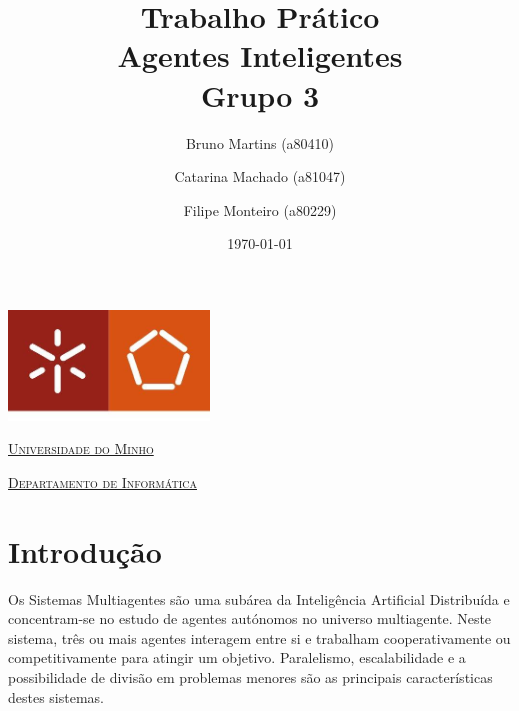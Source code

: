 \documentclass[a4paper]{article}
\begin{document}
\title{Trabalho Prático\\ Agentes Inteligentes\\Grupo 3}
\author{Bruno Martins (a80410) \and Catarina Machado (a81047) \and Filipe Monteiro (a80229)}
\date{\today}

\begin{titlepage}

  \thispagestyle{empty}
  \begin{center}
  \begin{minipage}{0.75\linewidth}
      \centering
      \includegraphics[width=0.4\textwidth]{eng.png}\par\vspace{1cm}
      \vspace{1.5cm}
      \href{https://www.uminho.pt/PT}{\scshape\LARGE Universidade do Minho} \par
      \vspace{1cm}
      \href{https://www.di.uminho.pt/}{\scshape\Large Departamento de Informática} \par
      \vspace{1.5cm}

\maketitle
\end{minipage}
\end{center}

\clearpage

\end{titlepage}

\tableofcontents

\pagebreak

\section{Introdução}

Os Sistemas Multiagentes são uma subárea da Inteligência Artificial Distribuída e concentram-se no estudo de agentes autónomos no universo multiagente. Neste sistema, três ou mais agentes interagem entre si e trabalham cooperativamente ou competitivamente para atingir um objetivo. Paralelismo, escalabilidade e a possibilidade de divisão em problemas menores são as principais características destes sistemas.
\end{document}
